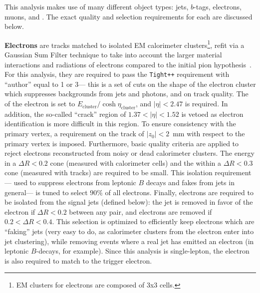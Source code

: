 This analysis makes use of many different object types: jets, $b$-tags, electrons, muons, and \met. The exact quality and selection requirements for each are discussed below.

\textbf{Electrons} are tracks matched to isolated EM calorimeter clusters\footnote{EM clusters for electrons are composed of 3x3 cells.}, refit via a Gaussian Sum Filter technique to take into account the larger material interactions and radiations of electrons compared to the initial pion hypothesis~\cite{Aad:2014nim,Aad:2014fxa,ATLAS-CONF-2014-032,ATLAS-CONF-2012-047}. For this analysis, they are required to pass the \texttt{Tight++} requirement with ``author'' equal to 1 or 3--- this is a set of cuts on the shape of the electron cluster which suppresses backgrounds from jets and photons, and on track quality. The \pt of the electron is set to $E_\mathrm{cluster} / \cosh \eta_\mathrm{cluster}$, and $|\eta| < 2.47$ is required. In addition, the so-called ``crack'' region of $1.37 < |\eta| < 1.52$ is vetoed as electron identification is more difficult in this region. To ensure consistency with the primary vertex, a requirement on the track of $|z_0| < 2$~mm with respect to the primary vertex is imposed. Furthermore, basic quality criteria are applied to reject electrons reconstructed from noisy or dead calorimeter clusters. The energy in a $\Delta R < 0.2$ cone (measured with calorimeter cells) and the \pt within a $\Delta R < 0.3$ cone (measured with tracks) are required to be small. This isolation requirement--- used to suppress electrons from leptonic $B$ decays and fakes from jets in general--- is tuned to select $90\%$ of all electrons. Finally, electrons are required to be isolated from the signal jets (defined below): the jet is removed in favor of the electron if $\Delta R < 0.2$ between any pair, and electrons are removed if $0.2 < \Delta R < 0.4$. This selection is optimized to efficiently keep electrons which are ``faking'' jets (very easy to do, as calorimeter clusters from the electron enter into jet clustering), while removing events where a real jet has emitted an electron (in leptonic $B$-decays, for example). Since this analysis is single-lepton, the electron is also required to match to the trigger electron.

